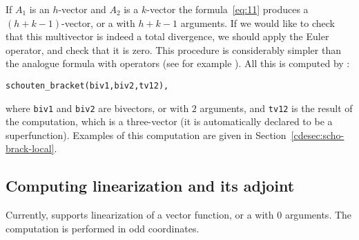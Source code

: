 If $A_1$ is an $h$-vector and $A_2$ is a $k$-vector the formula~\eqref{eq:11}
produces a $(h+k-1)$-vector, or a \cdiffop with $h+k-1$ arguments. If we would
like to check that this multivector is indeed a total divergence, we should
apply the Euler operator, and check that it is zero. This procedure is
considerably simpler than the analogue formula with operators (see for example
\cite{KerstenKrasilshchikVerboretsky:2004}). All this is computed by \cde:

\begin{verbatim}
schouten_bracket(biv1,biv2,tv12),
\end{verbatim}
where \texttt{biv1} and \texttt{biv2} are bivectors, or \cdiffops with $2$
arguments, and \texttt{tv12} is the result of the computation, which is a
three-vector (it is automatically declared to be a superfunction). Examples of
this computation are given in Section~\ref{cdesec:scho-brack-local}.

\subsection{Computing linearization and its adjoint}
\label{cdesec:linadj}

Currently, \cde supports linearization of a vector function, or a \cdiffop with
$0$ arguments. The computation is performed in odd coordinates.

